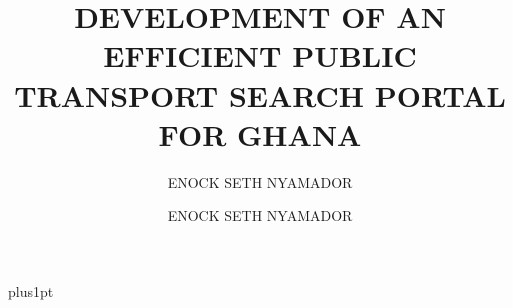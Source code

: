 \documentclass[oneside,12pt]{Latex/Classes/PhDthesisPSnPDF}
\title{DEVELOPMENT OF AN EFFICIENT PUBLIC TRANSPORT SEARCH PORTAL FOR GHANA}
\author{{ENOCK SETH NYAMADOR}}
\author{ENOCK SETH NYAMADOR}
\begin{document}

\renewcommand\baselinestretch{1.5}
\baselineskip=18pt plus1pt





\maketitle  %



\frontmatter





%   








\setcounter{secnumdepth}{3} %
\setcounter{tocdepth}{3}    %
\renewcommand\contentsname{TABLE OF CONTENTS}
\tableofcontents            %


\renewcommand\listfigurename{LIST OF FIGURES}
\listoffigures	%
\end{document}
